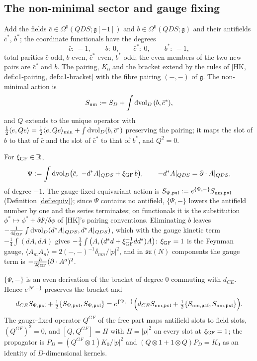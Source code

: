 \subsection{The non-minimal sector and gauge fixing}

\begin{definition}
\label{def:nm}
Add the fields $\bar c\in\Omega^0(QDS;\mathfrak g[-1])$ and $b\in\Omega^0(QDS;\mathfrak g)$ and their antifields $\bar c^*$, $b^*$; the coordinate functionals have the degrees
\[
\bar c:\ -1,\qquad b:\ 0,\qquad \bar c^*:\ 0,\qquad b^*:\ -1,
\]
total parities $\bar c$ odd, $b$ even, $\bar c^*$ even, $b^*$ odd; the even members of the two new pairs are $\bar c^*$ and $b$. The pairing, $K_0$ and the bracket extend by the rules of [HK, def:c1-pairing, def:c1-bracket] with the fibre pairing $(-,-)$ of $\mathfrak g$. The non-minimal action is
\[
S_{\rm nm}:=S_D+\int\mathrm{dvol}_D\,(b,\bar c^*),
\]
and $Q$ extends to the unique operator with $\frac12\langle e,Qe\rangle=\frac12\langle e,Qe\rangle_{\rm min}+\int\mathrm{dvol}_D(b,\bar c^*)$ preserving the pairing; it maps the slot of $b$ to that of $\bar c$ and the slot of $\bar c^*$ to that of $b^*$, and $Q^2=0$.
\end{definition}

\begin{definition}
\label{def:gf}
For $\xi_{\rm GF}\in\mathbb R$,
\[
\Psi:=\int\mathrm{dvol}_D\big(\bar c,\ -d^*A|_{QDS}+\xi_{\rm GF}\,b\big),\qquad -d^*A|_{QDS}=\partial\cdot A|_{QDS},
\]
of degree $-1$. The gauge-fixed equivariant action is $S_{\Psi,\mathfrak{psl}}:=e^{\{\Psi,-\}}S_{{\rm nm},\mathfrak{psl}}$ (Definition \ref{def:equiv}); since $\Psi$ contains no antifield, $\{\Psi,-\}$ lowers the antifield number by one and the series terminates; on functionals it is the substitution $\phi^*\mapsto\phi^*+\delta\Psi/\delta\phi$ of [HK]'s pairing conventions. Eliminating $b$ leaves $-\frac1{4\xi_{\rm GF}}\int\mathrm{dvol}_D(d^*A|_{QDS},d^*A|_{QDS})$, which with the gauge kinetic term $-\frac14\int(dA,dA)$ gives $-\frac14\int\big(A,(d^*d+\xi_{\rm GF}^{-1}dd^*)A\big)$: $\xi_{\rm GF}=1$ is the Feynman gauge, $\langle A_mA_n\rangle=2(-,-)^{-1}\delta_{mn}/|p|^2$, and in $\mathfrak{su}(N)$ components the gauge term is $-\frac{\hbar}{2\xi_{\rm GF}}(\partial\cdot A^a)^2$.
\end{definition}

\begin{lemma}
\label{lem:canon}
$\{\Psi,-\}$ is an even derivation of the bracket of degree $0$ commuting with $d_{CE}$. Hence $e^{\{\Psi,-\}}$ preserves the bracket and
\[
d_{CE}S_{\Psi,\mathfrak{psl}}+\tfrac12\{S_{\Psi,\mathfrak{psl}},S_{\Psi,\mathfrak{psl}}\}=e^{\{\Psi,-\}}\Big(d_{CE}S_{{\rm nm},\mathfrak{psl}}+\tfrac12\{S_{{\rm nm},\mathfrak{psl}},S_{{\rm nm},\mathfrak{psl}}\}\Big).
\]
The gauge-fixed operator $Q^{GF}$ of the free part maps antifield slots to field slots, $(Q^{GF})^2=0$, and $[Q,Q^{GF}]=H$ with $H=|p|^2$ on every slot at $\xi_{\rm GF}=1$; the propagator is $P_D=(Q^{GF}\otimes1)K_0/|p|^2$ and $(Q\otimes1+1\otimes Q)P_D=K_0$ as an identity of $D$-dimensional kernels.
\end{lemma}

